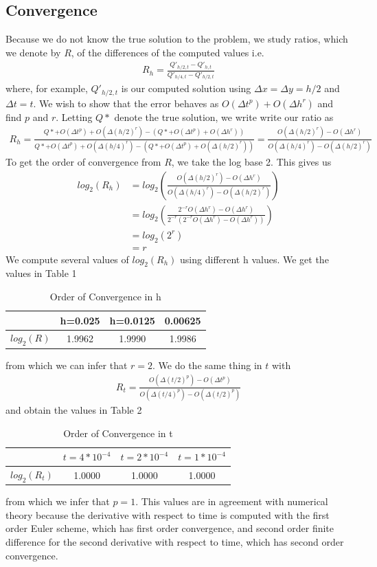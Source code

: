 \subsection{Convergence}
Because we do not know the true solution to the problem, we study ratios, which we denote by $R$, of the differences of the computed values i.e. 
\begin{align*}
R_h=\frac{Q'_{h/2,t} - Q'_{h,t}}{Q'_{h/4,t} - Q'_{h/2,t}}
\end{align*}
where, for example, $Q'_{h/2,t}$ is our computed solution using $\Delta x = \Delta y = h/2$ and $\Delta t = t$. We wish to show that the error behaves as $O(\Delta t^p) + O(\Delta h^r)$ and find $p$ and $r$. Letting $Q*$ denote the true solution, we write write our ratio as  
\begin{align*}
R_h = \frac{Q*+O(\Delta t^p) + O(\Delta (h/2)^r) - (Q* + O(\Delta t^p) + O(\Delta h^r))}{Q*+O(\Delta t^p) + O(\Delta (h/4)^r) - (Q*+O(\Delta t^p) + O(\Delta (h/2)^r))} = \frac{O(\Delta (h/2)^r)-O(\Delta h^r)}{O(\Delta (h/4)^r) - O(\Delta (h/2)^r)}
\end{align*}
To get the order of convergence from $R$, we take the log base 2. This gives us 
\begin{align*}
log_2(R_h) &= log_2(\frac{O(\Delta (h/2)^r)-O(\Delta h^r)}{O(\Delta (h/4)^r) - O(\Delta (h/2)^r)}) \\ 
&= log_2(\frac{2^{-r}O(\Delta h^r)-O(\Delta h^r)}{2^{-r}(2^{-r}O(\Delta h^r)-O(\Delta h^r))}) \\
&= log_2(2^{r}) \\
&= r
\end{align*}
We compute several values of $log_2(R_h)$ using different h values. We get the values in Table 1
\begin{table}[]
\centering
\caption{Order of Convergence in h}
\label{my-label}
\begin{tabular}{|c|c|c|c|}
\hline 
 & h=0.025 & h=0.0125 & 0.00625 \\ 
\hline 
$log_2(R)$ & 1.9962 & 1.9990 & 1.9986 \\ 
\hline 
\end{tabular} 
\end{table}
from which we can infer that $r = 2$. We do the same thing in $t$ with
\begin{align*}
R_t = \frac{O(\Delta (t/2)^p)-O(\Delta t^p)}{O(\Delta (t/4)^p) - O(\Delta (t/2)^p)}
\end{align*} 
and obtain the values in Table 2
\begin{table}[]
\centering
\caption{Order of Convergence in t}
\label{my-label}
\begin{tabular}{|c|c|c|c|}
\hline 
 & $t=4*10^{-4}$ & $t=2*10^{-4}$ & $t=1*10^{-4}$ \\ 
\hline 
$log_2(R_t)$ & 1.0000 & 1.0000 & 1.0000 \\ 
\hline 
\end{tabular} 
\end{table}
from which we infer that $p=1$. This values are in agreement with numerical theory because the derivative with respect to time is computed with the first order Euler scheme, which has first order convergence, and second order finite difference for the second derivative with respect to time, which has second order convergence. 

